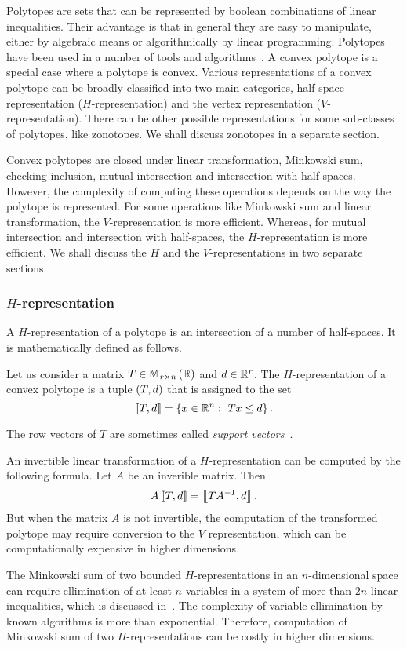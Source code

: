 Polytopes are sets that can be represented by boolean combinations of
linear inequalities.  Their advantage is that in general they are easy
to manipulate, either by algebraic means or algorithmically by linear
programming.  Polytopes have been used in a number of tools and
algorithms~\cite{todo}.  A convex polytope is a special case where a
polytope is convex.  Various representations of a convex polytope can
be broadly classified into two main categories, half-space
representation ($H$-representation) and the vertex representation
($V$-representation).  There can be other possible representations for
some sub-classes of polytopes, like zonotopes.  We shall discuss
zonotopes in a separate section.

Convex polytopes are closed under linear transformation, Minkowski
sum, checking inclusion, mutual intersection and intersection with
half-spaces.  However, the complexity of computing these operations
depends on the way the polytope is represented.  For some operations
like Minkowski sum and linear transformation, the $V$-representation
is more efficient.  Whereas, for mutual intersection and intersection
with half-spaces, the $H$-representation is more efficient.  We shall
discuss the $H$ and the $V$-representations in two separate sections.

\subsubsection{$H$-representation}
A $H$-representation of a polytope is an intersection of a number of
half-spaces.  It is mathematically defined as follows.
%
\begin{definition}[$H$-representation]
Let us consider a matrix $T\in\mathbb{M}_{r\times n}\left(\mathbb{R}\right)$ and $d\in\mathbb{R}^r$.
The $H$-representation of a convex polytope is a tuple $\left(T,d\right)$
that is assigned to the set
%
\[
\left\llbracket T,d\right\rrbracket=\left\{x\in\mathbb{R}^n:~Tx\leq d\right\}.
\]
%
\end{definition}
%
The row vectors of $T$ are sometimes called \emph{support vectors}~\cite{todo}.

An invertible linear transformation of a $H$-representation can be
computed by the following formula.  Let $A$ be an inverible matrix.
Then
%
\[
A\left\llbracket T,d\right\rrbracket=\left\llbracket TA^{-1},d\right\rrbracket.
\]
%
But when the matrix $A$ is not invertible, the computation of the
transformed polytope may require conversion to the $V$ representation,
which can be computationally expensive in higher dimensions.

The Minkowski sum of two bounded $H$-representations in an
$n$-dimensional space can require ellimination of at least
$n$-variables in a system of more than $2n$ linear inequalities, which
is discussed in~\cite{kvasnica2005minkowski}.  The complexity of
variable ellimination by known algorithms is more than exponential.
Therefore, computation of Minkowski sum of two $H$-representations can
be costly in higher dimensions.

